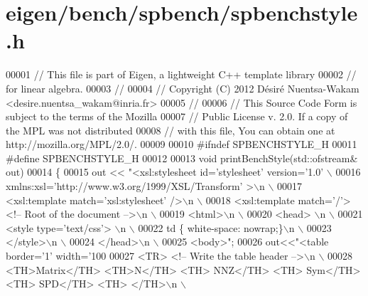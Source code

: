 \hypertarget{eigen_2bench_2spbench_2spbenchstyle_8h_source}{}\section{eigen/bench/spbench/spbenchstyle.h}
\label{eigen_2bench_2spbench_2spbenchstyle_8h_source}

\begin{DoxyCode}
00001 \textcolor{comment}{// This file is part of Eigen, a lightweight C++ template library}
00002 \textcolor{comment}{// for linear algebra.}
00003 \textcolor{comment}{//}
00004 \textcolor{comment}{// Copyright (C) 2012 Désiré Nuentsa-Wakam <desire.nuentsa\_wakam@inria.fr>}
00005 \textcolor{comment}{//}
00006 \textcolor{comment}{// This Source Code Form is subject to the terms of the Mozilla}
00007 \textcolor{comment}{// Public License v. 2.0. If a copy of the MPL was not distributed}
00008 \textcolor{comment}{// with this file, You can obtain one at http://mozilla.org/MPL/2.0/.}
00009 
00010 \textcolor{preprocessor}{#ifndef SPBENCHSTYLE\_H}
00011 \textcolor{preprocessor}{#define SPBENCHSTYLE\_H}
00012 
00013 \textcolor{keywordtype}{void} printBenchStyle(std::ofstream& out)
00014 \{
00015   out << \textcolor{stringliteral}{"<xsl:stylesheet id='stylesheet' version='1.0' \(\backslash\)}
00016 \textcolor{stringliteral}{      xmlns:xsl='http://www.w3.org/1999/XSL/Transform' >\(\backslash\)n \(\backslash\)}
00017 \textcolor{stringliteral}{      <xsl:template match='xsl:stylesheet' />\(\backslash\)n \(\backslash\)}
00018 \textcolor{stringliteral}{      <xsl:template match='/'> <!-- Root of the document -->\(\backslash\)n \(\backslash\)}
00019 \textcolor{stringliteral}{      <html>\(\backslash\)n \(\backslash\)}
00020 \textcolor{stringliteral}{        <head> \(\backslash\)n \(\backslash\)}
00021 \textcolor{stringliteral}{          <style type='text/css'> \(\backslash\)n \(\backslash\)}
00022 \textcolor{stringliteral}{            td \{ white-space: nowrap;\}\(\backslash\)n \(\backslash\)}
00023 \textcolor{stringliteral}{          </style>\(\backslash\)n \(\backslash\)}
00024 \textcolor{stringliteral}{        </head>\(\backslash\)n \(\backslash\)}
00025 \textcolor{stringliteral}{        <body>"};
00026   out<<\textcolor{stringliteral}{"<table border='1' width='100%
00027 \textcolor{stringliteral}{        <TR> <!-- Write the table header -->\(\backslash\)n \(\backslash\)}
00028 \textcolor{stringliteral}{        <TH>Matrix</TH> <TH>N</TH> <TH> NNZ</TH>  <TH> Sym</TH>  <TH> SPD</TH> <TH> </TH>\(\backslash\)n \(\backslash\)}
}
\end{DoxyCode}

